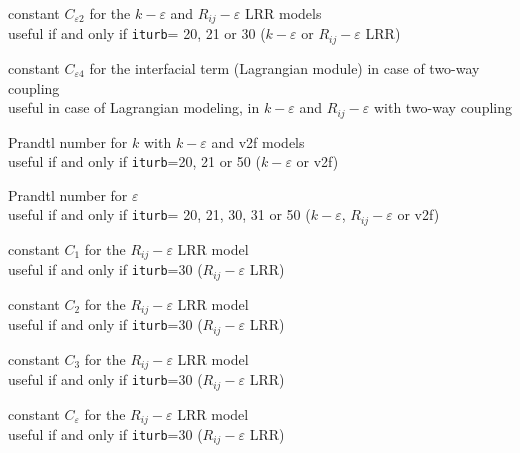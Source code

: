 {constant $C_{\varepsilon 2}$ for the $k-\varepsilon$ and
$R_{ij}-\varepsilon$ LRR models\\
useful if and only if {\tt iturb}= 20, 21 or 30
($k-\varepsilon$ or $R_{ij}-\varepsilon$ LRR)}


{constant $C_{\varepsilon 4}$ for the interfacial term (Lagrangian module) in
case of two-way coupling\\
useful in case of Lagrangian modeling, in $k-\varepsilon$ and $R_{ij}-\varepsilon$
with two-way coupling}

{Prandtl number for $k$ with $k-\varepsilon$ and v2f models\\
useful if and only if {\tt iturb}=20, 21 or 50
($k-\varepsilon$ or v2f)}

{Prandtl number for $\varepsilon$\\
useful if and only if {\tt iturb}= 20,
21, 30, 31 or 50 ($k-\varepsilon$, $R_{ij}-\varepsilon$ or v2f)}


{constant $C_1$ for the $R_{ij}-\varepsilon$ LRR model\\
useful if and only if {\tt iturb}=30
($R_{ij}-\varepsilon$ LRR)}

{constant $C_2$ for the $R_{ij}-\varepsilon$ LRR model\\
useful if and only if {\tt iturb}=30
($R_{ij}-\varepsilon$ LRR)}

{constant $C_3$ for the $R_{ij}-\varepsilon$ LRR model\\
useful if and only if {\tt iturb}=30
($R_{ij}-\varepsilon$ LRR)}

{constant $C_\varepsilon$ for the $R_{ij}-\varepsilon$ LRR model\\
useful if and only if {\tt iturb}=30
($R_{ij}-\varepsilon$ LRR)}

